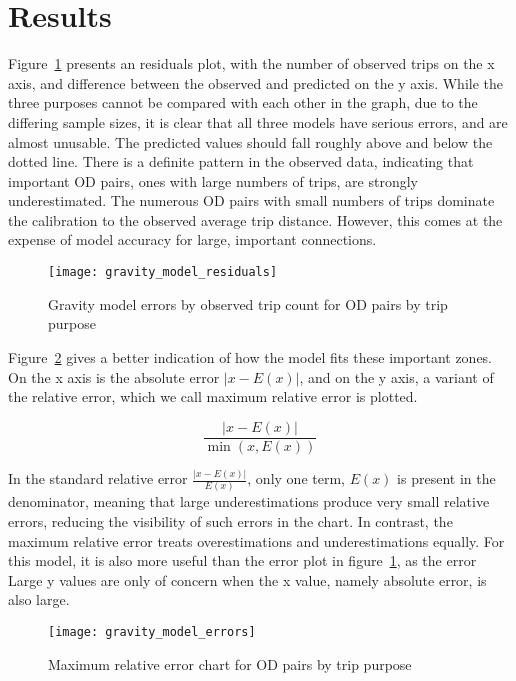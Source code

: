 \section{Results}
Figure~\ref{fig:gravity-residuals} presents an residuals plot, with the number of observed trips on the x axis, and difference between the observed and predicted on the y axis. While the three purposes cannot be compared with each other in the graph, due to the differing sample sizes, it is clear that all three models have serious errors, and are almost unusable. The predicted values should fall roughly above and below the dotted line. There is a definite pattern in the observed data, indicating that important OD pairs, ones with large numbers of trips, are strongly underestimated. The numerous OD pairs with small numbers of trips dominate the calibration to the observed average trip distance. However, this comes at the expense of model accuracy for large, important connections.


\begin{figure}[H]
\centering
\texttt{[image: gravity\_model\_residuals]}
\caption{Gravity model errors by observed trip count for OD pairs by trip purpose}
\label{fig:gravity-residuals}
\end{figure}

Figure~\ref{fig:gravity-errors} gives a better indication of how the model fits these important zones. On the x axis is the absolute error $|x - E(x)|$, and on the y axis, a variant of the relative error, which we call maximum relative error is plotted. 

$$\frac{|x-E(x)|}{\min(x, E(x))}$$

In the standard relative error $\frac{|x-E(x)|}{E(x)}$, only one term, $E(x)$ is present in the denominator, meaning that large underestimations produce very small relative errors, reducing the visibility of such errors in the chart. In contrast, the maximum relative error treats overestimations and underestimations equally. For this model, it is also more useful than the error plot in figure~\ref{fig:gravity-residuals}, as the error Large y values are only of concern when the x value, namely absolute error, is also large.

\begin{figure}[H]
\centering
\texttt{[image: gravity\_model\_errors]}
\caption{Maximum relative error chart for OD pairs by trip purpose}
\label{fig:gravity-errors}

\end{figure}

